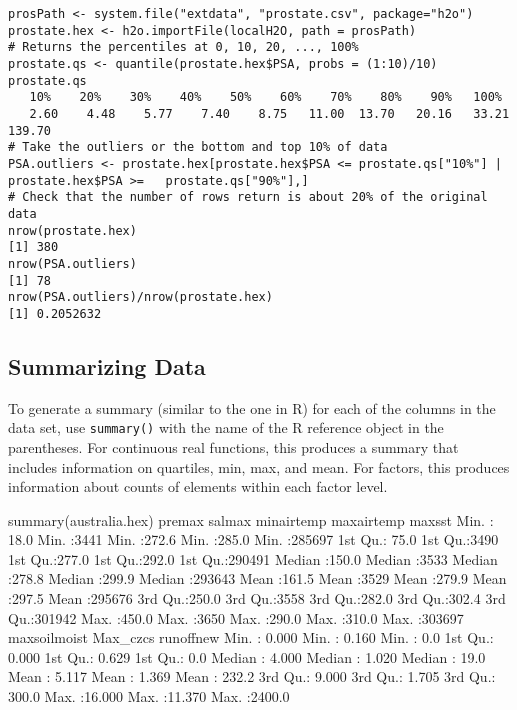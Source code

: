 \begin{lstlisting}[breaklines,basicstyle=\ttfamily]
prosPath <- system.file("extdata", "prostate.csv", package="h2o")
prostate.hex <- h2o.importFile(localH2O, path = prosPath)
# Returns the percentiles at 0, 10, 20, ..., 100%
prostate.qs <- quantile(prostate.hex$PSA, probs = (1:10)/10)
prostate.qs
   10%    20%    30%    40%    50%    60%    70%    80%    90%   100% 
   2.60    4.48    5.77    7.40    8.75   11.00  13.70   20.16   33.21  139.70 
# Take the outliers or the bottom and top 10% of data
PSA.outliers <- prostate.hex[prostate.hex$PSA <= prostate.qs["10%"] | prostate.hex$PSA >=   prostate.qs["90%"],]
# Check that the number of rows return is about 20% of the original data
nrow(prostate.hex)
[1] 380
nrow(PSA.outliers)
[1] 78
nrow(PSA.outliers)/nrow(prostate.hex)
[1] 0.2052632
\end{lstlisting}


\subsection{Summarizing Data}
To generate a summary (similar to the one in R) for each of the columns in the data set, use {\texttt{summary()}} with the name of the R reference object in the parentheses. 
For continuous real functions, this produces a summary that includes information on quartiles, min, max, and mean. 
For factors, this produces information about counts of elements within each factor level. 

\begin{spverbatim}
summary(australia.hex)
 premax          salmax         minairtemp      maxairtemp      maxsst          
 Min.   : 18.0   Min.   :3441   Min.   :272.6   Min.   :285.0   Min.   :285697  
 1st Qu.: 75.0   1st Qu.:3490   1st Qu.:277.0   1st Qu.:292.0   1st Qu.:290491  
 Median :150.0   Median :3533   Median :278.8   Median :299.9   Median :293643  
 Mean   :161.5   Mean   :3529   Mean   :279.9   Mean   :297.5   Mean   :295676  
 3rd Qu.:250.0   3rd Qu.:3558   3rd Qu.:282.0   3rd Qu.:302.4   3rd Qu.:301942  
 Max.   :450.0   Max.   :3650   Max.   :290.0   Max.   :310.0   Max.   :303697  
 maxsoilmoist     Max_czcs         runoffnew       
 Min.   : 0.000   Min.   : 0.160   Min.   :   0.0  
 1st Qu.: 0.000   1st Qu.: 0.629   1st Qu.:   0.0  
 Median : 4.000   Median : 1.020   Median :  19.0  
 Mean   : 5.117   Mean   : 1.369   Mean   : 232.2  
 3rd Qu.: 9.000   3rd Qu.: 1.705   3rd Qu.: 300.0  
 Max.   :16.000   Max.   :11.370   Max.   :2400.0  
\end{spverbatim}


